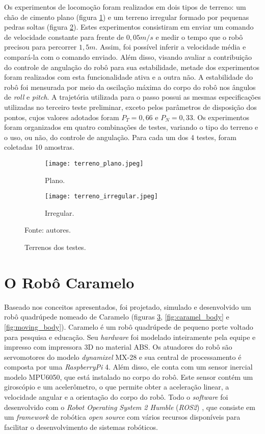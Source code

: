 \documentclass[conference]{IEEEtran}
\begin{document}
  Os experimentos de locomoção foram realizados em dois tipos de terreno: um chão de cimento plano (figura \ref{fig:terreno_plano}) e um terreno irregular formado por pequenas pedras soltas (figura \ref{fig:terreno_irregular}). Estes experimentos consistiram em enviar um comando de velocidade constante para frente de $0,05 m/s$ e medir o tempo que o robô precisou para percorrer $1,5 m$. Assim, foi possível inferir a velocidade média e compará-la com o comando enviado. Além disso, visando avaliar a contribuição do controle de angulação do robô para sua estabilidade, metade dos experimentos foram realizados com esta funcionalidade ativa e a outra não. A estabilidade do robô foi mensurada por meio da oscilação máxima do corpo do robô nos ângulos de \textit{roll} e \textit{pitch}. A trajetória utilizada para o passo possui as mesmas especificações utilizadas no terceiro teste preliminar, exceto pelos parâmetros de disposição dos pontos, cujos valores adotados foram $P_T = 0,66$ e $P_N = 0,33$. Os experimentos foram organizados em quatro combinações de testes, variando o tipo do terreno e o uso, ou não, do controle de angulação. Para cada um dos 4 testes, foram coletadas 10 amostras.

  \begin{figure}[htbp]
    \centering
    \begin{subfigure}[htbp]{0.24\textwidth}
      \centering
      \texttt{[image: terreno\_plano.jpeg]}
      \caption{Plano.}
      \label{fig:terreno_plano}
    \end{subfigure}
    \begin{subfigure}[htbp]{0.24\textwidth}
      \centering
      \texttt{[image: terreno\_irregular.jpeg]}
      \caption{Irregular.}
      \label{fig:terreno_irregular}
    \end{subfigure}
    \vfill
    \caption{Terrenos dos testes.}
    Fonte: autores.
    \label{fig:terrenos}
  \end{figure}

\section{O Robô Caramelo}

Baseado nos conceitos apresentados, foi projetado, simulado e desenvolvido um robô quadrúpede nomeado de Caramelo (figuras \ref{fig:terrenos}, \ref{fig:caramel_body} e \ref{fig:moving_body}). Caramelo é um robô quadrúpede de pequeno porte voltado para pesquisa e educação. Seu \textit{hardware} foi modelado inteiramente pela equipe e impresso com impressora 3D no material ABS. Os atuadores do robô são servomotores do modelo \textit{dynamixel} MX-28 e sua central de processamento é composta por uma \textit{RaspberryPi} 4. Além disso, ele conta com um sensor inercial modelo MPU6050, que está instalado no corpo do robô. Este sensor contém um giroscópio e um acelerômetro, o que permite obter a aceleração linear, a velocidade angular e a orientação do corpo do robô. Todo o \textit{software} foi desenvolvido com o \textit{Robot Operating System 2 Humble} (\textit{ROS2}) \cite{ROS2Humble}, que consiste em um \textit{framework} de robótica \textit{open source} com vários recursos disponíveis para facilitar o desenvolvimento de sistemas robóticos.
\end{document}
